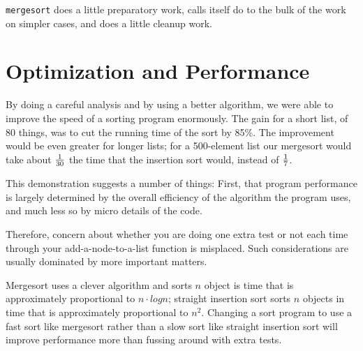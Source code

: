 \begin{flushleft}
\verb% void mergesort(struct list *data, int length) % \\*
\verb% {% \\*
\verb%   ...% \\*
\verb%   if (length < SMALL_SIZE )  % \\*
\verb%     insertion_sort(data, length);% \\*
\verb%   else {% \\*
\verb%     split_list(data, top, bottom);% \\*
\verb%     mergesort(top,    length/2);% \\*
\verb%     mergesort(bottom, length/2);% \\*
\verb%     merge_lists(top, bottom, data);% \\*
\verb%     return;% \\*
\verb%   }% \\*
\verb% }% \\*
\end{flushleft}

{\tt mergesort} does a little preparatory work, calls itself do to the
bulk of the work on simpler cases, and does a little cleanup work.  

\section{Optimization and Performance}

By doing a careful analysis and by using a better algorithm, we were
able to improve the speed of a sorting program enormously.  The gain for
a short list, of 80 things, was to cut the running time of the sort by
85\%.  The improvement would be even greater for longer lists; for a
500-element list our mergesort would take about $1\over 30$ the time
that the insertion sort would, instead of $ 1\over 7$.

This demonstration suggests a number of things:  First, that program
performance is largely determined by the overall efficiency of the
algorithm the program uses, and much less so by micro details of the
code.  

Therefore, concern about whether you are doing one extra test or not
each time through your add-a-node-to-a-list function is misplaced.  Such
considerations are usually dominated by more important matters.

Mergesort uses a clever algorithm and sorts $n$ object is time that is
approximately proportional to $n \cdot log n$; straight insertion sort
sorts $n$ objects in time that is approximately proportional to $n^2$.
Changing a sort program to use a fast sort like mergesort rather than a
slow sort like straight insertion sort will improve performance more
than fussing around with extra tests.

